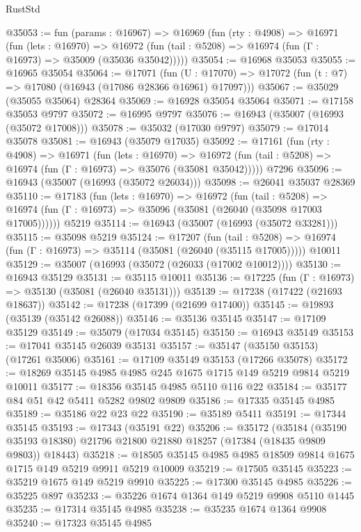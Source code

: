 \begin{lexlean}{RustStd}
\begin{coremodule}
@35053 := fun (params : @16967) =>
  @16969
    (fun (rty : @4908) =>
    @16971
      (fun (lets : @16970) =>
      @16972 (fun (tail : @5208) => @16974 (fun (Γ : @16973) => @35009 (@35036 @35042)))))
@35054 := @16968 @35053
@35055 := @16965 @35054
@35064 := @17071
    (fun (U : @17070) => @17072 (fun (t : @7) => @17080 (@16943 (@17086 @28366 @16961) @17097)))
@35067 := @35029 (@35055 @35064) @28364
@35069 := @16928 @35054 @35064
@35071 := @17158 @35053 @9797
@35072 := @16995 @9797
@35076 := @16943 (@35007 (@16993 (@35072 @17008)))
@35078 := @35032 (@17030 @9797)
@35079 := @17014 @35078
@35081 := @16943 (@35079 @17035)
@35092 := @17161
    (fun (rty : @4908) =>
    @16971
      (fun (lets : @16970) =>
      @16972 (fun (tail : @5208) => @16974 (fun (Γ : @16973) => @35076 (@35081 @35042)))))
    @7296
@35096 := @16943 (@35007 (@16993 (@35072 @26034)))
@35098 := @26041 @35037 @28369
@35110 := @17183
    (fun (lets : @16970) =>
    @16972
      (fun (tail : @5208) =>
      @16974 (fun (Γ : @16973) => @35096 (@35081 (@26040 (@35098 @17003 @17005))))))
    @5219
@35114 := @16943 (@35007 (@16993 (@35072 @33281)))
@35115 := @35098 @5219
@35124 := @17207
    (fun (tail : @5208) => @16974 (fun (Γ : @16973) => @35114 (@35081 (@26040 (@35115 @17005)))))
    @10011
@35129 := @35007 (@16993 (@35072 (@26033 (@17002 @10012))))
@35130 := @16943 @35129
@35131 := @35115 @10011
@35136 := @17225 (fun (Γ : @16973) => @35130 (@35081 (@26040 @35131)))
@35139 := @17238 (@17422 (@21693 @18637))
@35142 := @17238 (@17399 (@21699 @17400))
@35145 := @19893 (@35139 (@35142 @26088))
@35146 := @35136 @35145
@35147 := @17109 @35129
@35149 := @35079 (@17034 @35145)
@35150 := @16943 @35149
@35153 := @17041 @35145 @26039 @35131
@35157 := @35147 (@35150 @35153) (@17261 @35006)
@35161 := @17109 @35149 @35153 (@17266 @35078)
@35172 := @18269 @35145 @4985 @4985 @245 @1675 @1715 @149 @5219 @9814 @5219 @10011
@35177 := @18356 @35145 @4985 @5110 @116 @22
@35184 := @35177 @84 @51 @42 @5411 @5282 @9802 @9809
@35186 := @17335 @35145 @4985
@35189 := @35186 @22 @23 @22
@35190 := @35189 @5411
@35191 := @17344 @35145
@35193 := @17343 (@35191 @22)
@35206 := @35172
    (@35184 (@35190 @35193 @18380) @21796 @21800 @21880 @18257 (@17384 (@18435 @9809 @9803)) @18443)
@35218 := @18505 @35145 @4985 @4985 @18509 @9814 @1675 @1715 @149 @5219 @9911 @5219 @10009
@35219 := @17505 @35145
@35223 := @35219 @1675 @149 @5219 @9910
@35225 := @17300 @35145 @4985
@35226 := @35225 @897
@35233 := @35226 @1674 @1364 @149 @5219 @9908 @5110 @1445
@35235 := @17314 @35145 @4985
@35238 := @35235 @1674 @1364 @9908
@35240 := @17323 @35145 @4985

\end{coremodule}
\end{lexlean}
